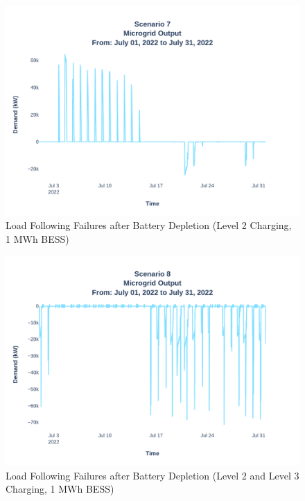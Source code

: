 \documentclass[conference, usletter]{IEEEtran}
\begin{document}
\begin{figure}
\centering
\includegraphics[width=\linewidth]{Fig/Option_3/4_Scenario_7_Run_3_Mg_Output_Jul_01_2022_to_Jul_31_2022.pdf}
\caption{\footnotesize Load Following Failures after Battery Depletion (Level 2 Charging, 1 MWh BESS)}
\label{fig:scenario3peakshaving}
\end{figure}
\begin{figure}
\centering
\includegraphics[width=\linewidth]{Fig/Option_3/4_Scenario_8_Run_3_Mg_Output_Jul_01_2022_to_Jul_31_2022.pdf}
\caption{\footnotesize Load Following Failures after Battery Depletion (Level 2 and Level 3 Charging, 1 MWh BESS)}
\label{fig:scenario4peakshaving}
\end{figure}
\end{document}
